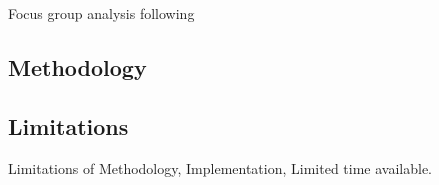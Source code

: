 Focus group analysis following \cite{asbury1995overview}

\subsection{Methodology}
\label{sub:method-discussion}

\subsection{Limitations}
\label{sub:limitations}

Limitations of Methodology, Implementation, Limited time available.


